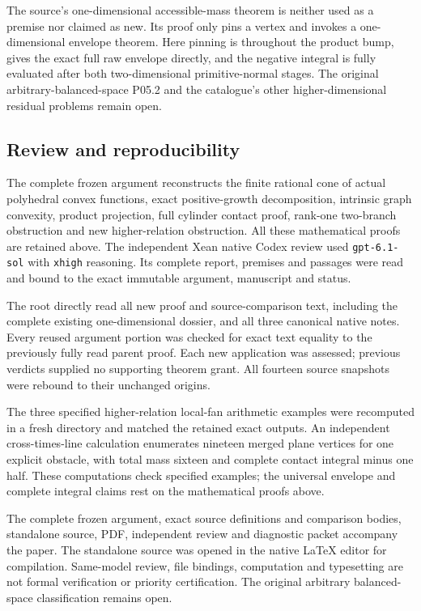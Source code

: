 \documentclass[
  11pt,
]{article}
\begin{document}
The source's one-dimensional accessible-mass theorem is neither used as
a premise nor claimed as new. Its proof only pins a vertex and invokes a
one-dimensional envelope theorem. Here pinning is throughout the product
bump, gives the exact full raw envelope directly, and the negative
integral is fully evaluated after both two-dimensional primitive-normal
stages. The original arbitrary-balanced-space P05.2 and the catalogue's
other higher-dimensional residual problems remain open.

\subsection{Review and reproducibility}

The complete frozen argument reconstructs the finite rational cone of
actual polyhedral convex functions, exact positive-growth decomposition,
intrinsic graph convexity, product projection, full cylinder contact proof,
rank-one two-branch obstruction and new higher-relation obstruction.
All these mathematical proofs are retained above. The independent Xean
native Codex review used \texttt{gpt-6.1-sol} with \texttt{xhigh}
reasoning. Its complete report, premises and passages were read and
bound to the exact immutable argument, manuscript and status.

The root directly read all new proof and source-comparison text,
including the complete existing one-dimensional dossier, and all three
canonical native notes. Every reused argument portion was checked for
exact text equality to the previously fully read parent proof.
Each new application was assessed; previous verdicts supplied no
supporting theorem grant. All fourteen source snapshots were rebound
to their unchanged origins.

The three specified higher-relation local-fan arithmetic examples were
recomputed in a fresh directory and matched the retained exact outputs.
An independent cross-times-line calculation enumerates nineteen merged
plane vertices for one explicit obstacle, with total mass sixteen and
complete contact integral minus one half. These computations check
specified examples; the universal envelope and complete integral claims
rest on the mathematical proofs above.

The complete frozen argument, exact source definitions and comparison
bodies, standalone source, PDF, independent review and diagnostic packet
accompany the paper. The standalone source was opened in the native
LaTeX editor for compilation. Same-model review, file bindings,
computation and typesetting are not formal verification or priority
certification. The original arbitrary balanced-space classification
remains open.
\end{document}
